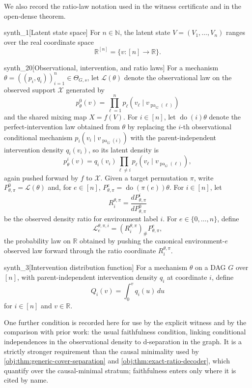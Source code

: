We also record the ratio-law notation used in the witness certificate and in the open-dense theorem.

\begin{definitionv}{synth_1}[Latent state space]
For \(n\in\mathbb N\), the latent state \(V=(V_1,\ldots,V_n)\) ranges over the real coordinate space
\[
\mathbb R^{[n]}=\{v:[n]\to\mathbb R\}.
\]
\end{definitionv}

\begin{definitionv}{synth_20}[Observational, intervention, and ratio laws]
For a mechanism \(\theta=((p_i,q_i))_{i=1}^n\in\Theta_{G,s}\), let \(\mathcal L(\theta)\) denote the observational law on the observed support \(\mathcal X\) generated by
\[
p^0_\theta(v)=\prod_{\ell=1}^n p_\ell(v_\ell\mid v_{\operatorname{pa}_G(\ell)})
\]
and the shared mixing map \(X=f(V)\). For \(i\in[n]\), let \(\operatorname{do}(i)\theta\) denote the perfect-intervention law obtained from \(\theta\) by replacing the \(i\)-th observational conditional mechanism \(p_i(v_i\mid v_{\operatorname{pa}_G(i)})\) with the parent-independent intervention density \(q_i(v_i)\), so its latent density is
\[
p^i_\theta(v)=q_i(v_i)\prod_{\ell\ne i}p_\ell(v_\ell\mid v_{\operatorname{pa}_G(\ell)}),
\]
again pushed forward by \(f\) to \(\mathcal X\). Given a target permutation \(\pi\), write \(P^0_{\theta,\pi}=\mathcal L(\theta)\) and, for \(e\in[n]\), \(P^e_{\theta,\pi}=\operatorname{do}(\pi(e))\theta\). For \(i\in[n]\), let
\[
R_i^{\theta,\pi}=\frac{dP^i_{\theta,\pi}}{dP^0_{\theta,\pi}}
\]
be the observed density ratio for environment label \(i\). For \(e\in\{0,\ldots,n\}\), define
\[
\mathcal L_e^{\theta,\pi,i}
  = (R_i^{\theta,\pi})_{\#}P^e_{\theta,\pi},
\]
the probability law on \(\mathbb R\) obtained by pushing the canonical environment-\(e\) observed law forward through the ratio coordinate \(R_i^{\theta,\pi}\).
\end{definitionv}

\begin{definitionv}{synth_3}[Intervention distribution function]
For a mechanism \(\theta\) on a DAG \(G\) over \([n]\), with parent-independent intervention density \(q_i\) at coordinate \(i\), define
\[
Q_i(v)=\int_0^v q_i(u)\,du
\]
for \(i\in[n]\) and \(v\in\mathbb R\).
\end{definitionv}

One further condition is recorded here for use by the explicit witness and by the comparison with prior work: the usual faithfulness condition, linking conditional independences in the observational density to d-separation in the graph. It is a strictly stronger requirement than the causal minimality used by \cref{obj:thm:generic-cover-separation} and \cref{obj:thm:exact-ratio-decoder}, which quantify over the causal-minimal stratum; faithfulness enters only where it is cited by name.

